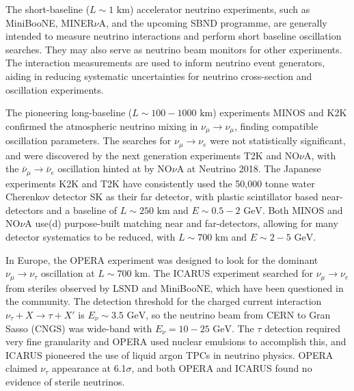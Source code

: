 The short-baseline ($L\sim 1\text{ km}$) accelerator neutrino experiments, such as MiniBooNE\cite{mb_design}, MINER$\nu$A\cite{minerva_design}, and the upcoming SBND programme\cite{sbnd}, are generally intended to measure neutrino interactions and perform short baseline oscillation searches. They may also serve as neutrino beam monitors for other experiments. The interaction measurements are used to inform neutrino event generators\cite{neut,genie,NuWro}, aiding in reducing systematic uncertainties for neutrino cross-section and oscillation experiments.

The pioneering long-baseline ($L\sim 100-1000\text{ km}$) experiments MINOS\cite{minos_obs} and K2K\cite{k2k_obs} confirmed the atmospheric neutrino mixing in $\nu_\mu \rightarrow \nu_\mu$, finding compatible oscillation parameters. The searches for $\nu_\mu \rightarrow \nu_e$ were not statistically significant\cite{k2k_noobs,minos_disc}, and were discovered by the next generation experiments T2K\cite{t2k_disc} and NO$\nu$A\cite{nova_disc}, with the $\bar{\nu}_\mu \rightarrow \bar{\nu}_e$ oscillation hinted at by NO$\nu$A at Neutrino 2018\cite{nova_neutrino2018}. The Japanese experiments K2K and T2K have consistently used the 50,000 tonne water Cherenkov detector SK\cite{superk} as their far detector, with plastic scintillator based near-detectors and a baseline of $L\sim250\text{ km}$ and $E\sim0.5-2\text{ GeV}$. Both MINOS and NO$\nu$A use(d) purpose-built matching near and far-detectors, allowing for many detector systematics to be reduced, with $L\sim700\text{ km}$ and $E\sim2-5\text{ GeV}$.

In Europe, the OPERA\cite{opera} experiment was designed to look for the dominant $\nu_\mu \rightarrow \nu_\tau$ oscillation at $L\sim700\text{ km}$. The ICARUS\cite{icarus} experiment searched for $\nu_\mu\rightarrow\nu_e$ from steriles observed by LSND\cite{lsnd} and MiniBooNE\cite{miniboone_sterile}, which have been questioned in the community\cite{lsnd_refute}. The detection threshold for the charged current interaction $\nu_\tau + X \rightarrow \tau + X'$ is $E_\nu\sim 3.5\text{ GeV}$, so the neutrino beam from CERN to Gran Sasso (CNGS)\cite{cngs} was wide-band with $E_\nu = 10-25\text{ GeV}$. The $\tau$ detection required very fine granularity and OPERA used nuclear emulsions to accomplish this, and ICARUS pioneered the use of liquid argon TPCs in neutrino physics. OPERA claimed $\nu_\tau$ appearance\cite{opera_final_tau} at 6.1$\sigma$, and both OPERA and ICARUS found no evidence of sterile neutrinos\cite{icarus_lsnd,opera_lsnd}.


